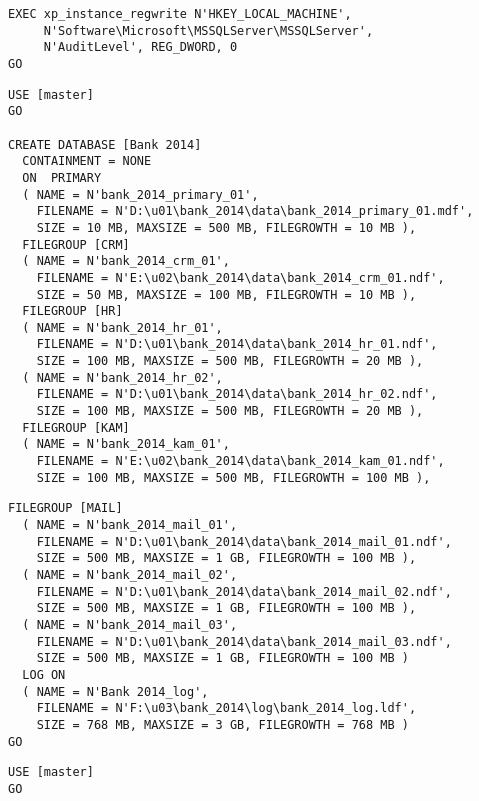 \begin{enumerate}
\begin{lstlisting}[language=ms_sql, caption={Ändern der
        Servereigenschaften}, label=admin_03_loesung_06]
EXEC xp_instance_regwrite N'HKEY_LOCAL_MACHINE', 
     N'Software\Microsoft\MSSQLServer\MSSQLServer', 
     N'AuditLevel', REG_DWORD, 0
GO
        \end{lstlisting}
        
        
        \begin{lstlisting}[language=ms_sql, caption={Ändern der
        Servereigenschaften}, label=admin_03_loesung_07]
USE [master]
GO

CREATE DATABASE [Bank 2014]
  CONTAINMENT = NONE
  ON  PRIMARY 
  ( NAME = N'bank_2014_primary_01', 
    FILENAME = N'D:\u01\bank_2014\data\bank_2014_primary_01.mdf', 
    SIZE = 10 MB, MAXSIZE = 500 MB, FILEGROWTH = 10 MB ), 
  FILEGROUP [CRM] 
  ( NAME = N'bank_2014_crm_01', 
    FILENAME = N'E:\u02\bank_2014\data\bank_2014_crm_01.ndf', 
    SIZE = 50 MB, MAXSIZE = 100 MB, FILEGROWTH = 10 MB ), 
  FILEGROUP [HR] 
  ( NAME = N'bank_2014_hr_01', 
    FILENAME = N'D:\u01\bank_2014\data\bank_2014_hr_01.ndf', 
    SIZE = 100 MB, MAXSIZE = 500 MB, FILEGROWTH = 20 MB ),
  ( NAME = N'bank_2014_hr_02', 
    FILENAME = N'D:\u01\bank_2014\data\bank_2014_hr_02.ndf', 
    SIZE = 100 MB, MAXSIZE = 500 MB, FILEGROWTH = 20 MB ), 
  FILEGROUP [KAM] 
  ( NAME = N'bank_2014_kam_01', 
    FILENAME = N'E:\u02\bank_2014\data\bank_2014_kam_01.ndf', 
    SIZE = 100 MB, MAXSIZE = 500 MB, FILEGROWTH = 100 MB ), 
        \end{lstlisting}
\clearpage
        \begin{lstlisting}[language=ms_sql]        
  FILEGROUP [MAIL] 
  ( NAME = N'bank_2014_mail_01', 
    FILENAME = N'D:\u01\bank_2014\data\bank_2014_mail_01.ndf', 
    SIZE = 500 MB, MAXSIZE = 1 GB, FILEGROWTH = 100 MB ),
  ( NAME = N'bank_2014_mail_02', 
    FILENAME = N'D:\u01\bank_2014\data\bank_2014_mail_02.ndf', 
    SIZE = 500 MB, MAXSIZE = 1 GB, FILEGROWTH = 100 MB ),
  ( NAME = N'bank_2014_mail_03', 
    FILENAME = N'D:\u01\bank_2014\data\bank_2014_mail_03.ndf', 
    SIZE = 500 MB, MAXSIZE = 1 GB, FILEGROWTH = 100 MB )
  LOG ON 
  ( NAME = N'Bank 2014_log', 
    FILENAME = N'F:\u03\bank_2014\log\bank_2014_log.ldf', 
    SIZE = 768 MB, MAXSIZE = 3 GB, FILEGROWTH = 768 MB )
GO
        \end{lstlisting}
        
        
        \begin{lstlisting}[language=ms_sql, caption={Hinzufügen einer
        Dateigruppe mit Datendatei}, label=admin_03_loesung_08]
USE [master]
GO


\end{lstlisting}
\end{enumerate}
